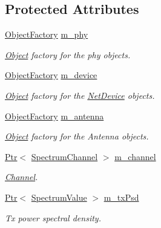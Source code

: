 \subsection*{Protected Attributes}
\begin{DoxyCompactItemize}
\item 
\hyperlink{classns3_1_1ObjectFactory}{Object\+Factory} \hyperlink{classns3_1_1WaveformGeneratorHelper_a51bae544a06afc1ec27b878655674792}{m\+\_\+phy}
\begin{DoxyCompactList}\small\item\em \hyperlink{classns3_1_1Object}{Object} factory for the phy objects. \end{DoxyCompactList}\item 
\hyperlink{classns3_1_1ObjectFactory}{Object\+Factory} \hyperlink{classns3_1_1WaveformGeneratorHelper_aa67df139d459938d940af894ec8e2764}{m\+\_\+device}
\begin{DoxyCompactList}\small\item\em \hyperlink{classns3_1_1Object}{Object} factory for the \hyperlink{classns3_1_1NetDevice}{Net\+Device} objects. \end{DoxyCompactList}\item 
\hyperlink{classns3_1_1ObjectFactory}{Object\+Factory} \hyperlink{classns3_1_1WaveformGeneratorHelper_acaeede90a4c077eb7451f1c46c159970}{m\+\_\+antenna}
\begin{DoxyCompactList}\small\item\em \hyperlink{classns3_1_1Object}{Object} factory for the Antenna objects. \end{DoxyCompactList}\item 
\hyperlink{classns3_1_1Ptr}{Ptr}$<$ \hyperlink{classns3_1_1SpectrumChannel}{Spectrum\+Channel} $>$ \hyperlink{classns3_1_1WaveformGeneratorHelper_a550fd32c6547a799717fadcfb90ba4a4}{m\+\_\+channel}
\begin{DoxyCompactList}\small\item\em \hyperlink{classns3_1_1Channel}{Channel}. \end{DoxyCompactList}\item 
\hyperlink{classns3_1_1Ptr}{Ptr}$<$ \hyperlink{classns3_1_1SpectrumValue}{Spectrum\+Value} $>$ \hyperlink{classns3_1_1WaveformGeneratorHelper_a2e645dbbbd5e8fded03836693993fdfa}{m\+\_\+tx\+Psd}
\begin{DoxyCompactList}\small\item\em Tx power spectral density. \end{DoxyCompactList}\end{DoxyCompactItemize}


